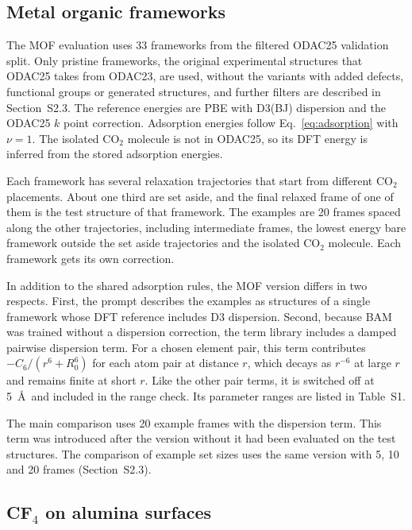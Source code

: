 \subsection{Metal organic frameworks}
\label{sec:mof-methods}

The MOF evaluation uses 33 frameworks from the filtered ODAC25 validation split.\cite{sriram2025odac25} Only pristine frameworks, the original experimental structures that ODAC25 takes from ODAC23, are used, without the variants with added defects, functional groups or generated structures, and further filters are described in Section~S2.3. The reference energies are PBE with D3(BJ) dispersion and the ODAC25 $k$ point correction. Adsorption energies follow Eq.~\eqref{eq:adsorption} with $\nu=1$. The isolated CO$_2$ molecule is not in ODAC25, so its DFT energy is inferred from the stored adsorption energies.

Each framework has several relaxation trajectories that start from different CO$_2$ placements. About one third are set aside, and the final relaxed frame of one of them is the test structure of that framework. The examples are 20 frames spaced along the other trajectories, including intermediate frames, the lowest energy bare framework outside the set aside trajectories and the isolated CO$_2$ molecule. Each framework gets its own correction.

In addition to the shared adsorption rules, the MOF version differs in two respects. First, the prompt describes the examples as structures of a single framework whose DFT reference includes D3 dispersion. Second, because BAM was trained without a dispersion correction, the term library includes a damped pairwise dispersion term. For a chosen element pair, this term contributes $-C_6/(r^6+R_0^6)$ for each atom pair at distance $r$, which decays as $r^{-6}$ at large $r$ and remains finite at short $r$. Like the other pair terms, it is switched off at 5~\AA\ and included in the range check. Its parameter ranges are listed in Table~S1.

The main comparison uses 20 example frames with the dispersion term. This term was introduced after the version without it had been evaluated on the test structures. The comparison of example set sizes uses the same version with 5, 10 and 20 frames (Section~S2.3).

\subsection{CF$_4$ on alumina surfaces}
\label{sec:cf4-methods}

